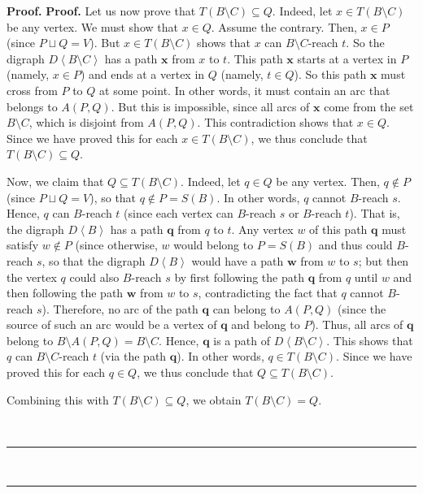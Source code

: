 \documentclass[numbers=enddot,12pt,final,onecolumn,notitlepage]{scrartcl}%
\theoremstyle{definition}
\newenvironment{proof}[1][Proof]{\noindent\textbf{#1.} }{\ \rule{0.5em}{0.5em}}
\theoremstyle{plainsl}
\begin{document}
\begin{proof}
\begin{proof}
Let us now prove that $T\left(  B\setminus C\right)  \subseteq Q$. Indeed, let
$x\in T\left(  B\setminus C\right)  $ be any vertex. We must show that $x\in
Q$. Assume the contrary. Then, $x\in P$ (since $P\sqcup Q=V$). But $x\in
T\left(  B\setminus C\right)  $ shows that $x$ can $B\setminus C$-reach $t$.
So the digraph $D\left\langle B\setminus C\right\rangle $ has a path
$\mathbf{x}$ from $x$ to $t$. This path $\mathbf{x}$ starts at a vertex in $P$
(namely, $x\in P$) and ends at a vertex in $Q$ (namely, $t\in Q$). So this
path $\mathbf{x}$ must cross from $P$ to $Q$ at some point. In other words, it
must contain an arc that belongs to $A\left(  P,Q\right)  $. But this is
impossible, since all arcs of $\mathbf{x}$ come from the set $B\setminus C$,
which is disjoint from $A\left(  P,Q\right)  $. This contradiction shows that
$x\in Q$. Since we have proved this for each $x\in T\left(  B\setminus
C\right)  $, we thus conclude that $T\left(  B\setminus C\right)  \subseteq Q$.

Now, we claim that $Q\subseteq T\left(  B\setminus C\right)  $. Indeed, let
$q\in Q$ be any vertex. Then, $q\notin P$ (since $P\sqcup Q=V$), so that
$q\notin P=S\left(  B\right)  $. In other words, $q$ cannot $B$-reach $s$.
Hence, $q$ can $B$-reach $t$ (since each vertex can $B$-reach $s$ or $B$-reach
$t$). That is, the digraph $D\left\langle B\right\rangle $ has a path
$\mathbf{q}$ from $q$ to $t$. Any vertex $w$ of this path $\mathbf{q}$ must
satisfy $w\notin P$ (since otherwise, $w$ would belong to $P=S\left(
B\right)  $ and thus could $B$-reach $s$, so that the digraph $D\left\langle
B\right\rangle $ would have a path $\mathbf{w}$ from $w$ to $s$; but then the
vertex $q$ could also $B$-reach $s$ by first following the path $\mathbf{q}$
from $q$ until $w$ and then following the path $\mathbf{w}$ from $w$ to $s$,
contradicting the fact that $q$ cannot $B$-reach $s$). Therefore, no arc of
the path $\mathbf{q}$ can belong to $A\left(  P,Q\right)  $ (since the source
of such an arc would be a vertex of $\mathbf{q}$ and belong to $P$). Thus, all
arcs of $\mathbf{q}$ belong to $B\setminus A\left(  P,Q\right)  =B\setminus
C$. Hence, $\mathbf{q}$ is a path of $D\left\langle B\setminus C\right\rangle
$. This shows that $q$ can $B\setminus C$-reach $t$ (via the path $\mathbf{q}%
$). In other words, $q\in T\left(  B\setminus C\right)  $. Since we have
proved this for each $q\in Q$, we thus conclude that $Q\subseteq T\left(
B\setminus C\right)  $.

Combining this with $T\left(  B\setminus C\right)  \subseteq Q$, we obtain
$T\left(  B\setminus C\right)  =Q$.


\end{proof}
\end{proof}
\end{document}

